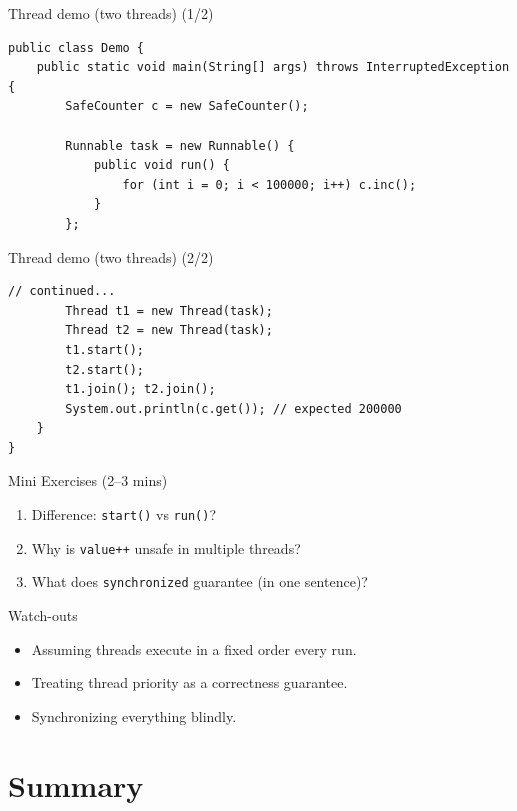 \documentclass{beamer}
\begin{document}
\begin{frame}[fragile]{Thread demo (two threads) (1/2)}
\begin{lstlisting}
public class Demo {
    public static void main(String[] args) throws InterruptedException {
        SafeCounter c = new SafeCounter();

        Runnable task = new Runnable() {
            public void run() {
                for (int i = 0; i < 100000; i++) c.inc();
            }
        };
\end{lstlisting}
  \slidesources{\OOPSUnitIIISources}
\end{frame}

\begin{frame}[fragile]{Thread demo (two threads) (2/2)}
\begin{lstlisting}
// continued...
        Thread t1 = new Thread(task);
        Thread t2 = new Thread(task);
        t1.start();
        t2.start();
        t1.join(); t2.join();
        System.out.println(c.get()); // expected 200000
    }
}
\end{lstlisting}
  \slidesources{\OOPSUnitIIISources}
\end{frame}

\begin{frame}{Mini Exercises (2--3 mins)}
  \begin{enumerate}[<+->]
    \item Difference: \texttt{start()} vs \texttt{run()}?
    \item Why is \texttt{value++} unsafe in multiple threads?
    \item What does \texttt{synchronized} guarantee (in one sentence)?
  \end{enumerate}
  \slidesources{\OOPSUnitIIISources}
\end{frame}

\begin{frame}{Watch-outs}
\begin{itemize}[<+->]
  \item Assuming threads execute in a fixed order every run.
  \item Treating thread priority as a correctness guarantee.
  \item Synchronizing everything blindly.
\end{itemize}
  \slidesources{\OOPSUnitIIISources}
\end{frame}

\section{Summary}
\label{sec:summary}
\end{document}
